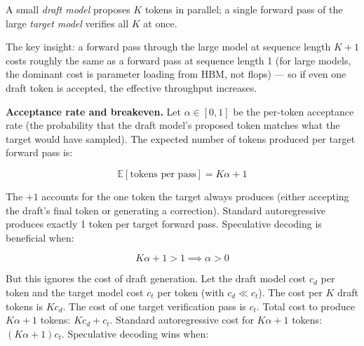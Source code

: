 A small \textit{draft model} proposes $K$ tokens in parallel; a single forward pass of the large \textit{target model} verifies all $K$ at once.

\begin{center}
\end{center}

The key insight: a forward pass through the large model at sequence length $K+1$ costs roughly the same as a forward pass at sequence length 1 (for large models, the dominant cost is parameter loading from HBM, not flops) --- so if even one draft token is accepted, the effective throughput increases.

\textbf{Acceptance rate and breakeven.} Let $\alpha \in [0,1]$ be the per-token acceptance rate (the probability that the draft model's proposed token matches what the target would have sampled). The expected number of tokens produced per target forward pass is:

$$\mathbb{E}[\text{tokens per pass}] = K\alpha + 1$$

The $+1$ accounts for the one token the target always produces (either accepting the draft's final token or generating a correction). Standard autoregressive produces exactly 1 token per target forward pass. Speculative decoding is beneficial when:

$$K\alpha + 1 > 1 \implies \alpha > 0$$

But this ignores the cost of draft generation. Let the draft model cost $c_d$ per token and the target model cost $c_t$ per token (with $c_d \ll c_t$). The cost per $K$ draft tokens is $K c_d$. The cost of one target verification pass is $c_t$. Total cost to produce $K\alpha + 1$ tokens: $K c_d + c_t$. Standard autoregressive cost for $K\alpha + 1$ tokens: $(K\alpha + 1) c_t$. Speculative decoding wins when:

